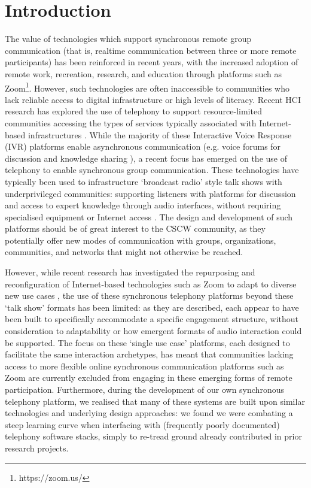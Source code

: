 \section{Introduction}

The value of technologies which support synchronous remote group communication (that is, realtime communication between three or more remote participants) has been reinforced in recent years, with the increased adoption of remote work, recreation, research, and education \cite{cumbo2021, scriven2021, takashi2012} through platforms such as Zoom\footnote{https://zoom.us/}. However, such technologies are often inaccessible to communities who lack reliable access to digital infrastructure or high levels of literacy. Recent HCI research has explored the use of telephony to support resource-limited communities accessing the types of services typically associated with Internet-based infrastructures \cite{khullar2021, Csik2016, Richardson2022, eitzinger2019}. While the majority of these Interactive Voice Response (IVR) platforms enable asynchronous communication (e.g. voice forums for discussion and knowledge sharing \cite{Patel2010}), a recent focus has emerged on the use of telephony to enable synchronous group communication. These technologies have typically been used to infrastructure `broadcast radio' style talk shows with underprivileged communities: supporting listeners with platforms for discussion and access to expert knowledge through audio interfaces, without requiring specialised equipment or Internet access \cite{Kazakos2016, Yadav2017, Talhouk2017}. The design and development of such platforms should be of great interest to the CSCW community, as they potentially offer new modes of communication with groups, organizations, communities, and networks that might not otherwise be reached.

However, while recent research has investigated the repurposing and reconfiguration of Internet-based technologies such as Zoom to adapt to diverse new use cases \cite{Bartindale2021}, the use of these synchronous telephony platforms beyond these `talk show' formats has been limited: as they are described, each appear to have been built to specifically accommodate a specific engagement structure, without consideration to adaptability or how emergent formats of audio interaction could be supported. The focus on these `single use case' platforms, each designed to facilitate the same interaction archetypes, has meant that communities lacking access to more flexible online synchronous communication platforms such as Zoom are currently excluded from engaging in these emerging forms of remote participation. Furthermore, during the development of our own synchronous telephony platform, we realised that many of these systems are built upon similar technologies and underlying design approaches: we found we were combating a steep learning curve when interfacing with (frequently poorly documented) telephony software stacks, simply to re-tread ground already contributed in prior research projects.

